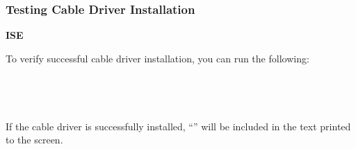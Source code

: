 \subsubsection{Testing Cable Driver Installation}
\textbf{ISE}
\begin{flushleft}
To verify successful cable driver installation, you can run the following:\\
 \\
 \\
 \\
 \\
If the cable driver is successfully installed, ``'' will be included in the text printed to the screen.
%
%
%
%
%
\end{flushleft}
\pagebreak

